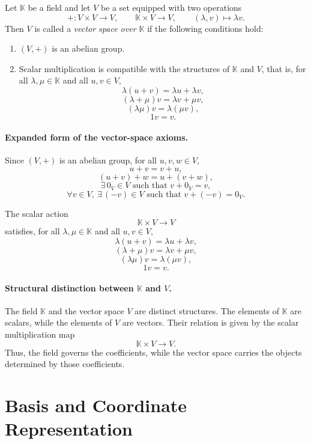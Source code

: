 \documentclass{article}
\begin{document}
	\begin{definition}
		Let $\mathbb{K}$ be a field and let $V$ be a set equipped with two operations
		$$
		+ : V\times V\to V,
		\qquad
		\mathbb{K}\times V\to V,\qquad (\lambda,v)\mapsto \lambda v.
		$$
		Then $V$ is called a \emph{vector space over $\mathbb{K}$} if the following conditions hold:
		
		\begin{enumerate}
			\item $(V,+)$ is an abelian group.
			
			\item Scalar multiplication is compatible with the structures of $\mathbb{K}$ and $V$, that is, for all $\lambda,\mu\in\mathbb{K}$ and all $u,v\in V$,
			$$
			\lambda(u+v)=\lambda u+\lambda v,
			$$
			$$
			(\lambda+\mu)v=\lambda v+\mu v,
			$$
			$$
			(\lambda\mu)v=\lambda(\mu v),
			$$
			$$
			1v=v.
			$$
		\end{enumerate}
	\end{definition}
	
	\paragraph{Expanded form of the vector-space axioms.}
	Since $(V,+)$ is an abelian group, for all $u,v,w\in V$,
	$$
	u+v=v+u,
	$$
	$$
	(u+v)+w=u+(v+w),
	$$
	$$
	\exists\,0_V\in V\text{ such that }v+0_V=v,
	$$
	$$
	\forall v\in V,\ \exists\,(-v)\in V\text{ such that }v+(-v)=0_V.
	$$
	
	The scalar action
	$$
	\mathbb{K}\times V\to V
	$$
	satisfies, for all $\lambda,\mu\in\mathbb{K}$ and all $u,v\in V$,
	$$
	\lambda(u+v)=\lambda u+\lambda v,
	$$
	$$
	(\lambda+\mu)v=\lambda v+\mu v,
	$$
	$$
	(\lambda\mu)v=\lambda(\mu v),
	$$
	$$
	1v=v.
	$$
	
	\paragraph{Structural distinction between $\mathbb{K}$ and $V$.}
	The field $\mathbb{K}$ and the vector space $V$ are distinct structures. The elements of $\mathbb{K}$ are scalars, while the elements of $V$ are vectors. Their relation is given by the scalar multiplication map
	$$
	\mathbb{K}\times V\to V.
	$$
	Thus, the field governs the coefficients, while the vector space carries the objects determined by those coefficients.
	
	\section{Basis and Coordinate Representation}
	
\end{document}
